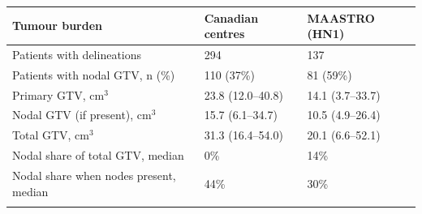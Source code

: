 \begin{tabular}{@{}lll@{}}
\toprule
Tumour burden & Canadian centres & MAASTRO (HN1) \\
\midrule
Patients with delineations & 294 & 137 \\
Patients with nodal GTV, n (\%) & 110 (37\%) & 81 (59\%) \\
Primary GTV, cm$^3$ & 23.8 (12.0--40.8) & 14.1 (3.7--33.7) \\
Nodal GTV (if present), cm$^3$ & 15.7 (6.1--34.7) & 10.5 (4.9--26.4) \\
Total GTV, cm$^3$ & 31.3 (16.4--54.0) & 20.1 (6.6--52.1) \\
Nodal share of total GTV, median & 0\% & 14\% \\
Nodal share when nodes present, median & 44\% & 30\% \\
\botrule
\end{tabular}
